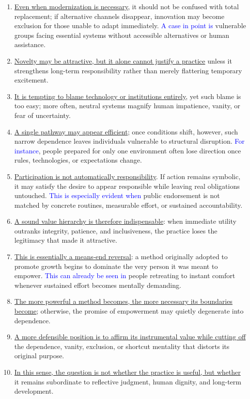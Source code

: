 \begin{enumerate}
    \item \underline{Even when modernization is necessary}, it should not be confused with total replacement; if alternative channels disappear, innovation may become exclusion for those unable to adapt immediately. \textcolor{blue}{A case in point is} vulnerable groups facing essential systems without accessible alternatives or human assistance.
    \item \underline{Novelty may be attractive, but it alone cannot justify a practice} unless it strengthens long-term responsibility rather than merely flattering temporary excitement.
    \item \underline{It is tempting to blame technology or institutions entirely}, yet such blame is too easy; more often, neutral systems magnify human impatience, vanity, or fear of uncertainty.
    \item \underline{A single pathway may appear efficient}; once conditions shift, however, such narrow dependence leaves individuals vulnerable to structural disruption. \textcolor{blue}{For instance}, people prepared for only one environment often lose direction once rules, technologies, or expectations change.
    \item \underline{Participation is not automatically responsibility}. If action remains symbolic, it may satisfy the desire to appear responsible while leaving real obligations untouched. \textcolor{blue}{This is especially evident when} public endorsement is not matched by concrete routines, measurable effort, or sustained accountability.
    \item \underline{A sound value hierarchy is therefore indispensable}: when immediate utility outranks integrity, patience, and inclusiveness, the practice loses the legitimacy that made it attractive.
    \item \underline{This is essentially a means-end reversal}: a method originally adopted to promote growth begins to dominate the very person it was meant to empower. \textcolor{blue}{This can already be seen in} people retreating to instant comfort whenever sustained effort becomes mentally demanding.
    \item \underline{The more powerful a method becomes, the more necessary its boundaries become}; otherwise, the promise of empowerment may quietly degenerate into dependence.
    \item \underline{A more defensible position is to affirm its instrumental value while cutting off} the dependence, vanity, exclusion, or shortcut mentality that distorts its original purpose.
    \item \underline{In this sense, the question is not whether the practice is useful, but whether} it remains subordinate to reflective judgment, human dignity, and long-term development.
\end{enumerate}

